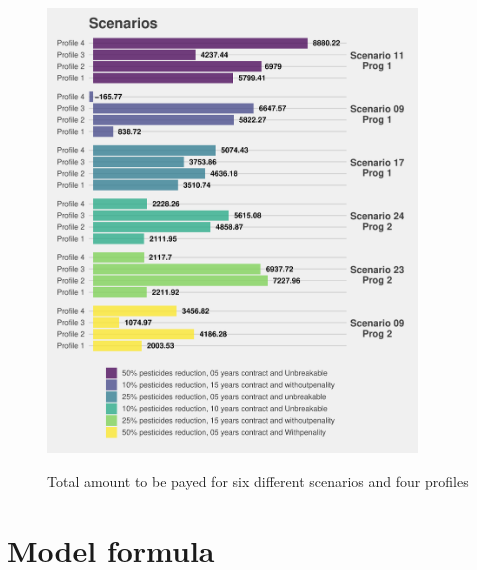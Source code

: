 \documentclass[12pt]{article}
\begin{document}
\begin{figure}[H]
 \centering
 \includegraphics[width=0.875\textwidth]{figures/scenarios.pdf}\\
 \caption{Total amount to be payed for six different scenarios and four
          profiles}
 \label{fig:scenarios}
\end{figure}

\section*{Model formula}
\end{document}
